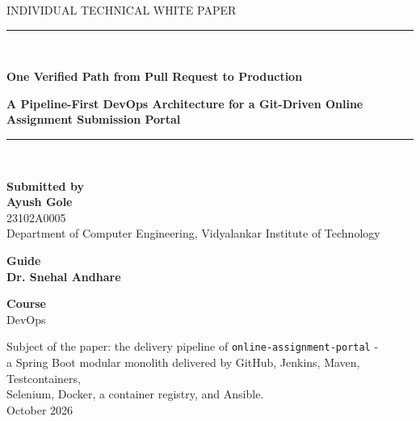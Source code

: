 \documentclass[10pt,a4paper]{article}
\newcommand{\mytitle}{One Verified Path from Pull Request to Production}
\newcommand{\mysubtitle}{A Pipeline-First DevOps Architecture for a Git-Driven Online
Assignment Submission Portal}
\newcommand{\myname}{Ayush Gole}
\newcommand{\myreg}{23102A0005}
\newcommand{\mydept}{Department of Computer Engineering, Vidyalankar Institute of Technology}
\newcommand{\myguide}{Dr. Snehal Andhare}
\newcommand{\mycourse}{DevOps}
\begin{document}
\thispagestyle{empty}
\begin{center}
\vspace*{1.6cm}

{\footnotesize\color{muted}INDIVIDUAL TECHNICAL WHITE PAPER}\\[0.25cm]
{\color{rule}\rule{0.42\textwidth}{0.6pt}}\\[0.9cm]

{\fontsize{16}{19.2}\selectfont\bfseries \mytitle\par}
\vspace{0.45cm}
{\fontsize{12}{15}\selectfont\bfseries\color{steel} \mysubtitle\par}

\vspace{0.9cm}
{\color{rule}\rule{0.42\textwidth}{0.6pt}}\\[1.1cm]

{\fontsize{11}{13.2}\selectfont
\textbf{Submitted by}\\[0.2cm]
{\fontsize{12}{14.4}\selectfont\bfseries \myname}\\[0.15cm]
\myreg\\[0.15cm]
\mydept\par}

\vspace{0.9cm}

{\fontsize{11}{13.2}\selectfont
\textbf{Guide}\\[0.2cm]
{\fontsize{12}{14.4}\selectfont\bfseries \myguide}\par}

\vspace{0.9cm}

{\fontsize{11}{13.2}\selectfont
\textbf{Course}\\[0.2cm]
\mycourse\par}

\vfill

{\footnotesize\color{muted}
Subject of the paper: the delivery pipeline of \texttt{online-assignment-portal} -\\
a Spring Boot modular monolith delivered by GitHub, Jenkins, Maven, Testcontainers,\\
Selenium, Docker, a container registry, and Ansible.\\[0.5cm]
October 2026}

\vspace{0.4cm}
\end{center}
\end{document}

